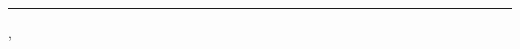 
\thispagestyle{empty}
\begin{vplace}[0.7]
  \centering
  {\LARGE\titulolivro\par}
\end{vplace}
\cleardoublepage

\thispagestyle{empty}
\begin{center}
  \vspace*{0.12\textheight}
  {\large\textls[160]{\scshape\MakeLowercase{\autorlivro}}\par}
  \vspace{0.12\textheight}
  {\fontsize{30}{34}\selectfont\titulolivro\par}
  \vspace{1.2\onelineskip}
  {\color{fio}\rule{0.25\textwidth}{0.4pt}\par}
  \vspace{1.2\onelineskip}
  {\large\itshape\subtitulolivro\par}
  \vfill
  {\small\textls[120]{\scshape\MakeLowercase{\editoralivro}}\par}
  \vspace{0.3\onelineskip}
  {\small\cidadelivro, \anolivro\par}
\end{center}
\clearpage

